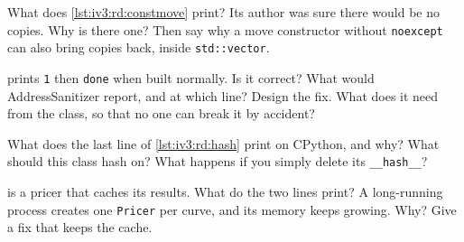 \begin{question}\label{iq:iv3:reading-debugging-and-software-design:16}
What does \cref{lst:iv3:rd:constmove} print? Its author was sure there would be no copies. Why is there one? Then say why a move constructor without \texttt{noexcept} can also bring copies back, inside \texttt{std::vector}.
\label{lst:iv3:rd:constmove}
\end{question}

\begin{question}\label{iq:iv3:reading-debugging-and-software-design:17}
 prints \texttt{1} then \texttt{done} when built normally. Is it correct? What would AddressSanitizer report, and at which line? Design the fix. What does it need from the class, so that no one can break it by accident?
\label{lst:iv3:rd:callback}
\end{question}

\begin{question}\label{iq:iv3:reading-debugging-and-software-design:18}
What does the last line of \cref{lst:iv3:rd:hash} print on CPython, and why? What should this class hash on? What happens if you simply delete its \texttt{\_\_hash\_\_}?
\label{lst:iv3:rd:hash}
\end{question}

\begin{question}\label{iq:iv3:reading-debugging-and-software-design:19}
 is a pricer that caches its results. What do the two lines print? A long-running process creates one \texttt{Pricer} per curve, and its memory keeps growing. Why? Give a fix that keeps the cache.
\label{lst:iv3:rd:cache}
\end{question}

